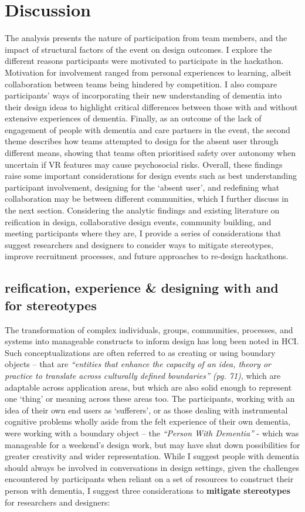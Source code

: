 \section{Discussion}
\label{sec:Discussion}
The analysis presents the nature of participation from team members, and the impact of structural factors of the event on design outcomes. I explore the different reasons participants were motivated to participate in the hackathon. Motivation for involvement ranged from personal experiences to learning, albeit collaboration between teams being hindered by competition. I also compare participants’ ways of incorporating their new understanding of dementia into their design ideas to highlight critical differences between those with and without extensive experiences of dementia. Finally, as an outcome of the lack of engagement of people with dementia and care partners in the event, the second theme describes how teams attempted to design for the absent user through different means, showing that teams often prioritised safety over autonomy when uncertain if VR features may cause psychosocial risks. Overall, these findings raise some important considerations for design events such as best understanding participant involvement, designing for the ‘absent user’, and redefining what collaboration may be between different communities, which I further discuss in the next section. Considering the analytic findings and existing literature on reification in design, collaborative design events, community building, and meeting participants where they are, I provide a series of considerations that suggest researchers and designers to consider ways to mitigate stereotypes, improve recruitment processes, and future approaches to re-design hackathons. 

\subsection{reification, experience \& designing with and for stereotypes}
The transformation of complex individuals, groups, communities, processes, and systems into manageable constructs to inform design has long been noted in HCI. Such conceptualizations are often referred to as creating or using boundary objects – that are \textit{“entities that enhance the capacity of an idea, theory or practice to translate across culturally defined boundaries” (pg. 71)}\citep{fox2011boundary}, which are adaptable across application areas, but which are also solid enough to represent one ‘thing’ or meaning across these areas too. The participants, working with an idea of their own end users as ‘sufferers’, or as those dealing with instrumental cognitive problems wholly aside from the felt experience of their own dementia, were working with a boundary object – the \textit{“Person With Dementia”} - which was manageable for a weekend’s design work, but may have shut down possibilities for greater creativity and wider representation. While I suggest people with dementia should always be involved in conversations in design settings, given the challenges encountered by participants when reliant on a set of resources to construct their person with dementia, I suggest three considerations to \textbf{mitigate stereotypes} for researchers and designers:

